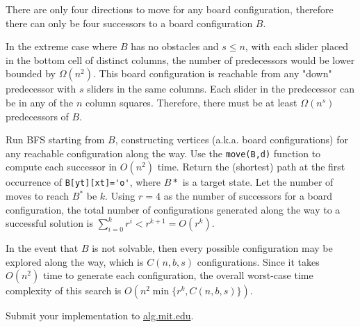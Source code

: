 \documentclass[12pt,twoside]{article}
\begin{document}
\begin{problems}
\begin{problemparts}
\problempart %
There are only four directions to move for any board configuration, therefore there can only be four successors to a board configuration $B$.

In the extreme case where $B$ has no obstacles and $s\leq n$, with each slider placed in the bottom cell of distinct columns, the number of predecessors would be lower bounded by $\Omega(n^2)$. This board configuration is reachable from any "down" predecessor with $s$ sliders in the same columns. Each slider in the predecessor can be in any of the $n$ column squares. Therefore, there must be at least $\Omega(n^s)$ predecessors of $B$.

\problempart %
Run BFS starting from $B$, constructing vertices (a.k.a. board configurations) for any reachable configuration along the way. Use the \verb|move(B,d)| function to compute each successor in $O(n^2)$ time. Return the (shortest) path at the first occurrence of \verb|B[yt][xt]='o'|, where $B*$ is a target state. Let the number of moves to reach $B^*$ be $k$. Using $r=4$ as the number of successors for a board configuration, the total number of configurations generated along the way to a successful solution is $\sum_{i=0}^k r^i<r^{k+1}=O(r^k)$.

In the event that $B$ is not solvable, then every possible configuration may be explored along the way, which is $C(n,b,s)$ configurations. Since it takes $O(n^2)$ time to generate each configuration, the overall worst-case time complexity of this search is $O(n^2\min\{r^k,C(n,b,s)\})$.

\problempart Submit your implementation to {\small\url{alg.mit.edu}}.
\end{problemparts}

\end{problems}
\end{document}
